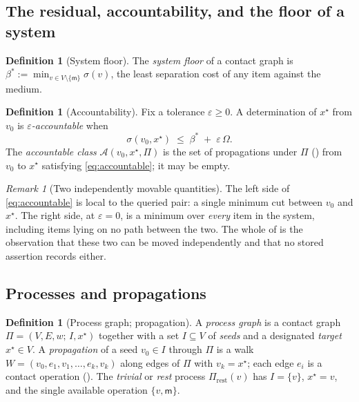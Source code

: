 \documentclass[11pt,twocolumn,a4paper]{article}
\theoremstyle{dirthm}
\theoremstyle{definition}
\newtheorem{definition}[theorem]{Definition}
\theoremstyle{remark}
\newtheorem{remark}[theorem]{Remark}
\newcommand{\V}{V}
\newcommand{\E}{E}
\newcommand{\wt}{w}
\newcommand{\med}{\mathsf{m}}
\newcommand{\flo}{\beta}
\newcommand{\str}{\sigma}
\newcommand{\Om}{\Omega}
\newcommand{\Proc}{\Pi}
\newcommand{\Walk}{W}
\newcommand{\acc}{\mathcal{A}}
\newcommand{\set}[1]{\{#1\}}
\newcommand{\eps}{\varepsilon}
\begin{document}
\subsection{The residual, accountability, and the floor of a system}

\begin{definition}[System floor]
\label{def:system-floor}
The \emph{system floor} of a contact graph is
$\flo^{\ast}:=\min_{v\in\V\setminus\set{\med}}\str(v)$, the least separation
cost of any item against the medium.
\end{definition}

\begin{definition}[Accountability]
\label{def:accountable}
Fix a tolerance $\eps\ge0$. A determination of $x^{\star}$ from $v_0$ is
\emph{$\eps$-accountable} when
\begin{equation}
\str(v_0,x^{\star})\;\le\;\flo^{\ast}\;+\;\eps\,\Om.
\label{eq:accountable}
\end{equation}
The \emph{accountable class} $\acc(v_0,x^{\star},\Proc)$ is the set of
propagations under $\Proc$ () from $v_0$ to $x^{\star}$
satisfying \eqref{eq:accountable}; it may be empty.
\end{definition}

\begin{remark}[Two independently movable quantities]
\label{rem:two-quantities}
The left side of \eqref{eq:accountable} is local to the queried pair: a single
minimum cut between $v_0$ and $x^{\star}$. The right side, at $\eps=0$, is a
minimum over \emph{every} item in the system, including items lying on no
path between the two. The whole of  is the observation
that these two can be moved independently and that no stored assertion
records either.
\end{remark}

\subsection{Processes and propagations}

\begin{definition}[Process graph; propagation]
\label{def:process}
A \emph{process graph} is a contact graph $\Proc=(\V,\E,\wt;\,I,x^{\star})$
together with a set $I\subseteq\V$ of \emph{seeds} and a designated
\emph{target} $x^{\star}\in\V$. A \emph{propagation} of a seed $v_0\in I$
through $\Proc$ is a walk $\Walk=(v_0,e_1,v_1,\dots,e_k,v_k)$ along edges of
$\Proc$ with $v_k=x^{\star}$; each edge $e_i$ is a contact operation
(). The \emph{trivial} or \emph{rest} process
$\Proc_{\mathrm{rest}}(v)$ has $I=\set{v}$, $x^{\star}=v$, and the single
available operation $\set{v,\med}$.
\end{definition}
\end{document}
